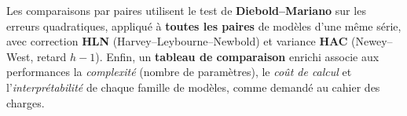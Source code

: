 Les comparaisons par paires utilisent le test de \textbf{Diebold--Mariano}
sur les erreurs quadratiques, appliqué à \textbf{toutes les paires} de
modèles d'une même série, avec correction \textbf{HLN}
(Harvey--Leybourne--Newbold) et variance \textbf{HAC} (Newey--West, retard
\(h-1\)). Enfin, un \textbf{tableau de comparaison} enrichi associe aux
performances la \emph{complexité} (nombre de paramètres), le \emph{coût de
calcul} et l'\emph{interprétabilité} de chaque famille de modèles, comme
demandé au cahier des charges.
